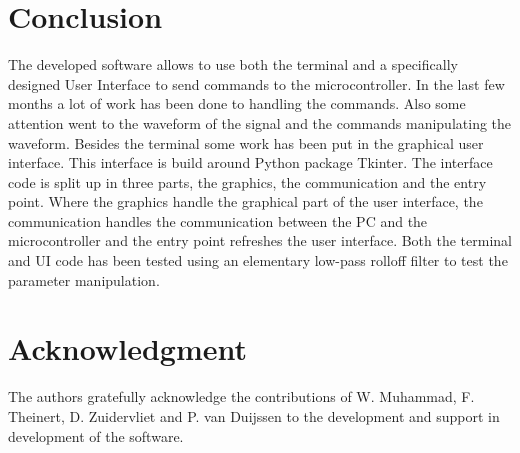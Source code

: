 \documentclass[conference]{IEEEtran}
\begin{document}


\section{Conclusion}
The developed software allows to use both the terminal and a specifically designed User Interface to send commands to the microcontroller. In the last few months a lot of work has been done to handling the commands. Also some attention went to the waveform of the signal and the commands manipulating the waveform. Besides the terminal some work has been put in the graphical user interface. This interface is build around Python package Tkinter. The interface code is split up in three parts, the graphics, the communication and the entry point. Where the graphics handle the graphical part of the user interface, the communication handles the communication between the PC and the microcontroller and the entry point refreshes the user interface. Both the terminal and UI code has been tested using an elementary low-pass rolloff filter to test the parameter manipulation.

\section*{Acknowledgment}
The authors gratefully acknowledge the contributions of W. Muhammad, F. Theinert, D. Zuidervliet and P. van Duijssen to the development and support in development of the software.
\end{document}
